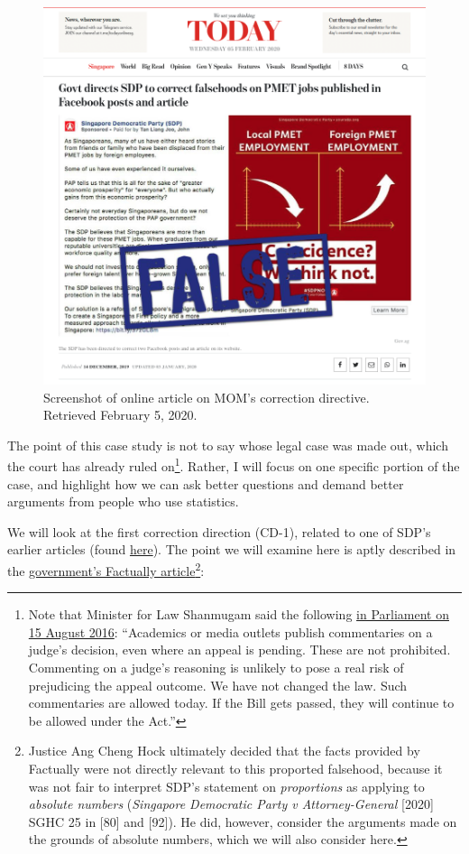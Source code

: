 \documentclass[
  openany]{book}
\begin{document}
\begin{figure}

{\centering \includegraphics[width=0.8\linewidth]{images/yousayisay/news1} 

}

\caption{Screenshot of online article on MOM's correction directive. Retrieved February 5, 2020.}\label{fig:today-sdp}
\end{figure}

The point of this case study is not to say whose legal case was made out, which the court has already ruled on\footnote{Note that Minister for Law Shanmugam said the following \href{https://sprs.parl.gov.sg/search/fullreport?sittingdate=15-08-2016}{in Parliament on 15 August 2016}: ``Academics or media outlets publish commentaries on a judge's decision, even where an appeal is pending. These are not prohibited. Commenting on a judge's reasoning is unlikely to pose a real risk of prejudicing the appeal outcome. We have not changed the law. Such commentaries are allowed today. If the Bill gets passed, they will continue to be allowed under the Act.''}. Rather, I will focus on one specific portion of the case, and highlight how we can ask better questions and demand better arguments from people who use statistics.

We will look at the first correction direction (CD-1), related to one of SDP's earlier articles (found \href{https://yoursdp.org/news/sdp_population_policy_hire_s_39_poreans_first_retrench_s_39_poreans_last}{here}). The point we will examine here is aptly described in the \href{https://www.gov.sg/article/factually-corrections-on-falsehoods-posted-by-sdp}{government's Factually article}\footnote{Justice Ang Cheng Hock ultimately decided that the facts provided by Factually were not directly relevant to this proported falsehood, because it was not fair to interpret SDP's statement on \emph{proportions} as applying to \emph{absolute numbers} (\emph{Singapore Democratic Party v Attorney-General} {[}2020{]} SGHC 25 in {[}80{]} and {[}92{]}). He did, however, consider the arguments made on the grounds of absolute numbers, which we will also consider here.}:
\end{document}
